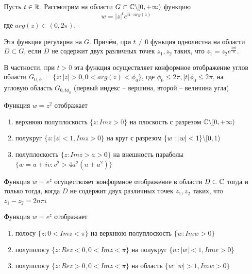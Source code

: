 \begin{definition} Пусть $t \in \mathbb{R}$. Рассмотрим на области $G \subset \mathbb{C} \backslash[0,+\infty)$ функцию $$w = |z|^te^{it \cdot arg(z)}$$ где $arg(z) \in (0, 2\pi)$. 

Эта функция регулярна на $G$. Причём, при $t \neq 0$ функция однолистна на области $D \subset G$, если $D$ не содержит двух различных точек $z_1, z_2$ таких, что  $z_1 = z_2e^{\frac{2\pi i}{n}}$. 

В частности, при $t > 0$ эта функция осуществляет конформное отображение углов области $G_{0,\phi_0} = \{z : |z| > 0, 0 < arg(z) < \phi_0\}$, где $\phi_0 \leq 2\pi, |t|\phi_0 \leq 2\pi$, на угловую область $G_{0, t\phi_0}$ (первый индекс -- вершина, второй -- величина угла)
\end{definition}

\begin{unnecessary}
\begin{example}
Функция $w = z^2$ отображает
\begin{enumerate}
    \item верхнюю полуплоскость $\{z : Im z > 0\}$ на плоскость с разрезом $\mathbb{C} \backslash [0,+\infty)$
    \item полукруг $\{z : |z| < 1, Im z > 0\}$ на круг с разрезом $\{w: |w| < 1\} \backslash [0,1)$
    \item полуплоскость $\{z: Im z > a > 0\}$ на внешность параболы $\{w = u + iv: v^2 > 4a^2(u + a^2)\}$
\end{enumerate}
\end{example}
\end{unnecessary}

\begin{definition} Функция $w = e^z$ осуществляет конформное отображение в области $D \subset \mathbb{C}$ тогда и только тогда, когда $D$ не содержит двух различных точек $z_1, z_2$ таких, что $z_1-z_2 = 2n\pi i$
\end{definition}

\begin{unnecessary}
\begin{example}
Функция $w = e^z$ отображает
\begin{enumerate}
    \item полосу $\{z : 0 < Im z < \pi\}$ на верхнюю полуплоскость $\{w : Im w > 0\}$
    \item полуполосу $\{z : Re z < 0, 0 < Im z < \pi\}$ на полукруг $\{w : |w| < 1, Im w > 0\}$
    \item полуполосу $\{z : Re z > 0, 0 < Im z < \pi\}$ на область $\{w : |w| > 1, Im w > 0\}$
\end{enumerate}
\end{example}
\end{unnecessary}

